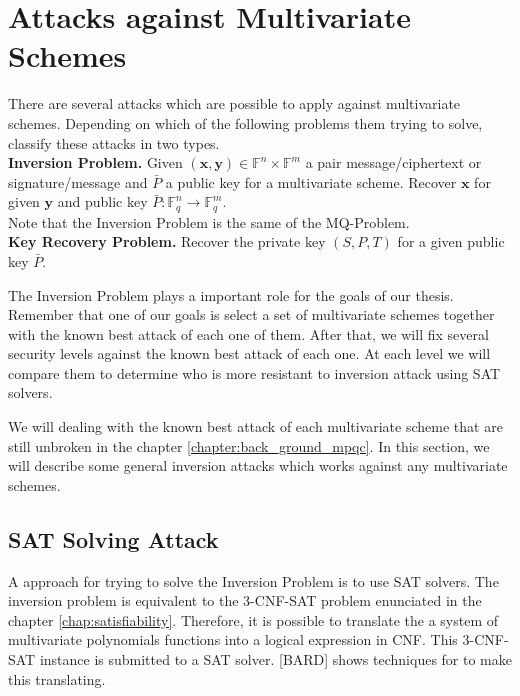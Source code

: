 \section{Attacks against Multivariate Schemes}
There are several attacks which are possible to apply against multivariate schemes. Depending on which of the following problems them trying to solve, \cite{wolfphdthesis} classify these attacks in two types.\\
\noindent
\textbf{Inversion Problem.} Given $(\boldsymbol{x},\boldsymbol{y}) \in \mathbb{F}^n\times \mathbb{F}^m$ a pair message/ciphertext or signature/message and $\bar{P}$ a public key for a multivariate scheme. Recover $\boldsymbol{x}$ for given $\boldsymbol{y}$ and public key $\bar{P}\colon\mathbb{F}_q^{n}\rightarrow \mathbb{F}_q^{m}$.\\
\noindent
Note that the Inversion Problem is the same of the MQ-Problem.\\
\noindent 
\textbf{Key Recovery Problem.} Recover the private key $(S,P,T)$ for a given public key $\bar{P}.$ 

The Inversion Problem plays a important role for the goals of our thesis. Remember that one of our goals is select a set of multivariate schemes together with the known best attack of each one of them. After that, we will fix several security levels against the known best attack of each one. At each level we will compare them to determine who is more resistant to inversion attack using SAT solvers. 
 
We will dealing with the known best attack of each multivariate scheme that are still unbroken in the chapter \ref{chapter:back_ground_mpqc}. In this section, we will describe some general inversion attacks which works against any multivariate schemes. 



\subsection{SAT Solving Attack}

A approach for trying to solve the Inversion Problem is to use SAT solvers. The inversion problem is equivalent to the 3-CNF-SAT problem enunciated in the chapter \ref{chap:satisfiability}. Therefore, it is possible to translate the a system of multivariate polynomials functions into a logical expression in CNF. This 3-CNF-SAT instance is submitted to a SAT solver. [BARD] shows techniques for to make this translating. 

